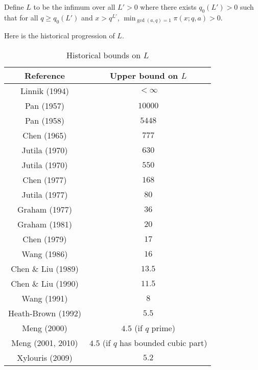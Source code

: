 \begin{definition}
Define $L$ to be the infimum over all $L'>0$ where there exists $q_0(L')>0$ such that for all $q\geq q_0(L')$ and $x>q^{L'}$, $\min_{\gcd(a,q)=1}\pi(x;q,a)>0$.
\end{definition}

Here is the historical progression of $L$.

\begin{table}[ht]
    \def\arraystretch{1.2}
    \centering
    \caption{Historical bounds on $L$}
    \begin{tabular}{|c|c|}
    \hline
    Reference & Upper bound on $L$\\
    \hline
    Linnik (1994) \cite{linnik-1} & $<\infty$\\
    \hline
    Pan (1957) \cite{pan_1957} & $10000$\\
    \hline
    Pan (1958) \cite{pan_1958} & $5448$\\
    \hline
    Chen (1965) \cite{chen_1965} & $777$\\
    \hline
    Jutila (1970) \cite{jutila_thesis} & $630$ \\
    \hline
    Jutila (1970) \cite{jutila_1970} & $550$ \\
    \hline
    Chen (1977) \cite{chen_1977} & $168$\\
    \hline
    Jutila (1977) \cite{jutila_linnik} & $80$\\
    \hline
    Graham (1977) \cite{graham_1977} & $36$\\
    \hline
    Graham (1981) \cite{graham_1981} & $20$\\
    \hline
    Chen (1979) \cite{chen_1979} & $17$\\
    \hline
    Wang (1986) \cite{wang_1986} & $16$\\
    \hline
    Chen \& Liu (1989) \cite{chen_liu_1989} & $13.5$\\
    \hline
    Chen \& Liu (1990) \cite{chen-liu-v} & $11.5$\\
    \hline
    Wang (1991) \cite{wang_1991} & $8$\\
    \hline
    Heath-Brown (1992) \cite{heath_brown_least_prime} & $5.5$\\
    \hline
    Meng (2000) \cite{meng} & $4.5$ (if $q$ prime)\\
    \hline
    Meng (2001, 2010) \cite{meng2001} \cite{meng2010} & $4.5$ (if $q$ has bounded cubic part)\\
    \hline
    Xylouris (2009) \cite{xylouris_thesis_2009} & $5.2$\\

\end{tabular}
\end{table}
